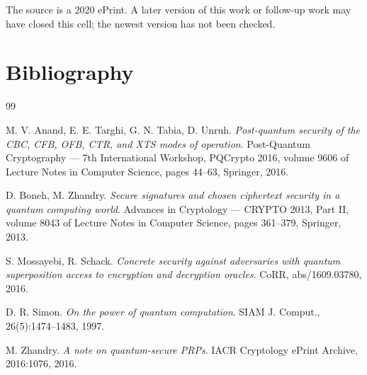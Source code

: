 \documentclass{aicr-conjecture}
\begin{document}
\begin{remark}\label{rem:currency}
The source is a 2020 ePrint. A later version of this work or follow-up
work may have closed this cell; the newest version has not been checked.
\end{remark}

\section{Bibliography}

\begin{aicrbibliography}{99}

M. V. Anand, E. E. Targhi, G. N. Tabia, D. Unruh.
\emph{Post-quantum security of the CBC, CFB, OFB, CTR, and XTS modes of
operation}.
Post-Quantum Cryptography --- 7th International Workshop, PQCrypto 2016,
volume 9606 of Lecture Notes in Computer Science, pages 44--63,
Springer, 2016.

D. Boneh, M. Zhandry.
\emph{Secure signatures and chosen ciphertext security in a quantum
computing world}.
Advances in Cryptology --- CRYPTO 2013, Part II, volume 8043 of Lecture
Notes in Computer Science, pages 361--379, Springer, 2013.

S. Mossayebi, R. Schack.
\emph{Concrete security against adversaries with quantum superposition
access to encryption and decryption oracles}.
CoRR, abs/1609.03780, 2016.

D. R. Simon.
\emph{On the power of quantum computation}.
SIAM J. Comput., 26(5):1474--1483, 1997.

M. Zhandry.
\emph{A note on quantum-secure PRPs}.
IACR Cryptology ePrint Archive, 2016:1076, 2016.

\end{aicrbibliography}
\end{document}
